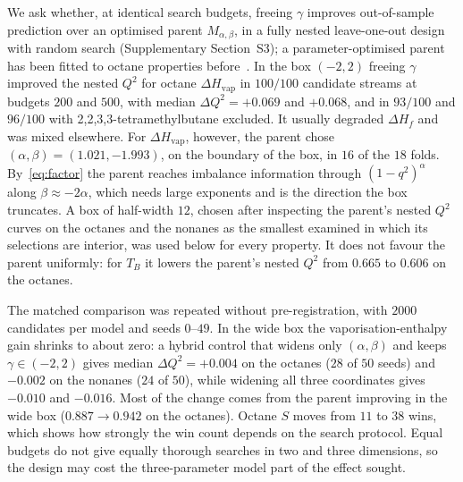 \documentclass[a5paper, 10pt]{article}
\theoremstyle{plain}
\theoremstyle{remark}
\theoremstyle{definition}
\begin{document}
We ask whether, at identical search budgets, freeing $\gamma$ improves
out-of-sample prediction over an optimised parent $M_{\alpha,\beta}$, in a
fully nested leave-one-out design with random search (Supplementary
Section~S3); a parameter-optimised parent has been fitted to octane
properties before~\cite{AliGutmanFurtulaAlbalahiHamza2025}. In the box
$(-2,2)$ freeing $\gamma$ improved the nested $Q^2$ for octane
$\Delta H_{\mathrm{vap}}$ in $100/100$ candidate streams at budgets $200$
and $500$, with median $\Delta Q^2 = +0.069$ and $+0.068$, and in $93/100$
and $96/100$ with 2,2,3,3-tetramethylbutane excluded. It usually degraded
$\Delta H_f$ and was mixed elsewhere. For $\Delta H_{\mathrm{vap}}$, however,
the parent chose $(\alpha,\beta) = (1.021, -1.993)$, on the boundary of the
box, in $16$ of the $18$ folds. By~\eqref{eq:factor} the parent reaches
imbalance information through $(1-q^2)^{\alpha}$ along
$\beta \approx -2\alpha$, which needs large exponents and is the direction
the box truncates. A box of half-width $12$, chosen after inspecting the
parent's nested $Q^2$ curves on the octanes and the nonanes as the
smallest examined in which its selections are interior, was used below for
every property. It does not favour the parent uniformly: for $T_B$ it
lowers the parent's nested $Q^2$ from $0.665$ to $0.606$ on the octanes.

The matched comparison was repeated without pre-registration, with
$2000$ candidates per model and seeds $0$--$49$. In the wide box the
vaporisation-enthalpy gain shrinks to about zero: a hybrid control that
widens only $(\alpha,\beta)$ and keeps $\gamma \in (-2,2)$ gives median
$\Delta Q^2 = +0.004$ on the octanes ($28$ of $50$ seeds) and $-0.002$ on
the nonanes ($24$ of $50$), while widening all three coordinates gives
$-0.010$ and $-0.016$. Most of the change comes from the parent improving
in the wide box ($0.887 \to 0.942$ on the octanes). Octane $S$ moves from
$11$ to $38$ wins, which shows how strongly the win count depends on the
search protocol. Equal budgets do not give equally thorough searches in
two and three dimensions, so the design may cost the three-parameter
model part of the effect sought.
\end{document}
